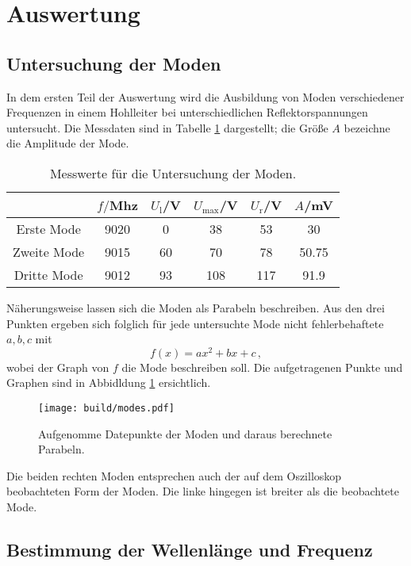 \section{Auswertung}
\label{sec:Auswertung}

\subsection{Untersuchung der Moden}
\label{subsec:auswertungModen}
In dem ersten Teil der Auswertung wird die Ausbildung von Moden verschiedener Frequenzen in einem Hohlleiter bei unterschiedlichen Reflektorspannungen untersucht. Die Messdaten sind in Tabelle \ref{tab:moden} dargestellt; die Größe $A$ bezeichne die Amplitude der Mode.\\

\begin{table}
\centering
\caption{Messwerte für die Untersuchung der Moden.}
\label{tab:moden}
\begin{tabular}{c c c c c c}
\toprule
& $f/$Mhz & $U_\text{l}$/V  & $U_\text{max}$/V & $U_\text{r}$/V & $A$/mV \\
\midrule
 Erste Mode & 9020 &  0 & 38  & 53  & 30    \tabularnewline
Zweite Mode & 9015 & 60 & 70  & 78  & 50.75 \tabularnewline
Dritte Mode & 9012 & 93 & 108 & 117 & 91.9  \tabularnewline
\bottomrule
\end{tabular}
\end{table}

Näherungsweise lassen sich die Moden als Parabeln beschreiben. Aus den drei Punkten ergeben sich folglich für jede untersuchte Mode nicht fehlerbehaftete $a, b, c$ mit
\begin{equation}
  f(x) = ax^2 + bx + c\,,
\end{equation}
wobei der Graph von $f$ die Mode beschreiben soll.
Die aufgetragenen Punkte und Graphen sind in Abbidldung \ref{fig:moden} ersichtlich.

\begin{figure}[H]
  \centering
  \texttt{[image: build/modes.pdf]}
  \caption{Aufgenomme Datepunkte der Moden und daraus berechnete Parabeln.}
  \label{fig:moden}
\end{figure}

Die beiden rechten Moden entsprechen auch der auf dem Oszilloskop beobachteten Form der Moden. Die linke
hingegen ist breiter als die beobachtete Mode.

\subsection{Bestimmung der Wellenlänge und Frequenz}
\label{subsec:auswertungfrequenz}

